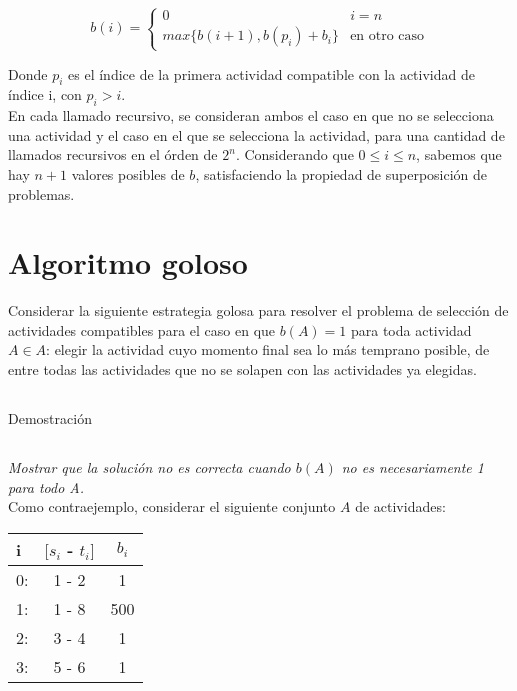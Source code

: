 \documentclass[10pt, a4paper]{article}
\begin{document}
$$b(i) = \begin{cases}
    0 & i = n \\
    max\{b(i+1), b(p_i) + b_i\} & \text{en otro caso}
\end{cases}$$

Donde $p_i$ es el índice de la primera actividad compatible con la actividad de índice i, con $p_i > i$. \\

En cada llamado recursivo, se consideran ambos el caso en que no se selecciona una actividad y el caso en el que se selecciona la actividad, para una cantidad de llamados recursivos en el órden de $2^n$. Considerando que $0 \leq i \leq n$, sabemos que hay $n+1$ valores posibles de $b$, satisfaciendo la propiedad de superposición de problemas.

\section{Algoritmo goloso}

Considerar la siguiente estrategia golosa para resolver el problema de selección de actividades compatibles para el caso en que $b(A) = 1$ para toda actividad $A \in A$: elegir la actividad cuyo momento final sea lo más temprano posible, de entre todas las actividades que no se solapen con las actividades ya elegidas.

\subsection{}
Demostración

\subsection{}
\emph{Mostrar que la solución no es correcta cuando $b(A)$ no es necesariamente 1 para todo A.} \\

Como contraejemplo, considerar el siguiente conjunto $A$ de actividades: \\

\begin{tabular}{l c c}
i & $[s_i$ - $t_i]$ & $b_i$ \\
\hline
0: & 1 - 2 & 1 \\
1: & 1 - 8 & 500 \\
2: & 3 - 4 & 1 \\
3: & 5 - 6 & 1
\end{tabular} \\
\end{document}

